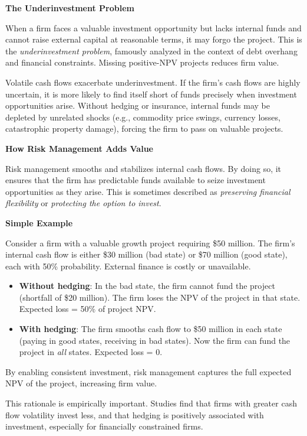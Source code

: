 \documentclass[11pt,openany]{book}
\providecommand{\tightlist}{\setlength{\itemsep}{0pt}\setlength{\parskip}{0pt}}
\begin{document}
\textbf{The Underinvestment Problem}

When a firm faces a valuable investment opportunity but lacks internal funds and cannot raise external capital at reasonable terms, it may forgo the project. This is the \emph{underinvestment problem}, famously analyzed in the context of debt overhang and financial constraints. Missing positive-NPV projects reduces firm value.

Volatile cash flows exacerbate underinvestment. If the firm's cash flows are highly uncertain, it is more likely to find itself short of funds precisely when investment opportunities arise. Without hedging or insurance, internal funds may be depleted by unrelated shocks (e.g., commodity price swings, currency losses, catastrophic property damage), forcing the firm to pass on valuable projects.

\textbf{How Risk Management Adds Value}

Risk management smooths and stabilizes internal cash flows. By doing so, it ensures that the firm has predictable funds available to seize investment opportunities as they arise. This is sometimes described as \emph{preserving financial flexibility} or \emph{protecting the option to invest}.

\textbf{Simple Example}

Consider a firm with a valuable growth project requiring \$50 million. The firm's internal cash flow is either \$30 million (bad state) or \$70 million (good state), each with 50\% probability. External finance is costly or unavailable.

\begin{itemize}
\tightlist
\item
  \textbf{Without hedging}: In the bad state, the firm cannot fund the project (shortfall of \$20 million). The firm loses the NPV of the project in that state. Expected loss = 50\% of project NPV.
\item
  \textbf{With hedging}: The firm smooths cash flow to \$50 million in each state (paying in good states, receiving in bad states). Now the firm can fund the project in \emph{all} states. Expected loss = 0.
\end{itemize}

By enabling consistent investment, risk management captures the full expected NPV of the project, increasing firm value.

This rationale is empirically important. Studies find that firms with greater cash flow volatility invest less, and that hedging is positively associated with investment, especially for financially constrained firms.
\end{document}

